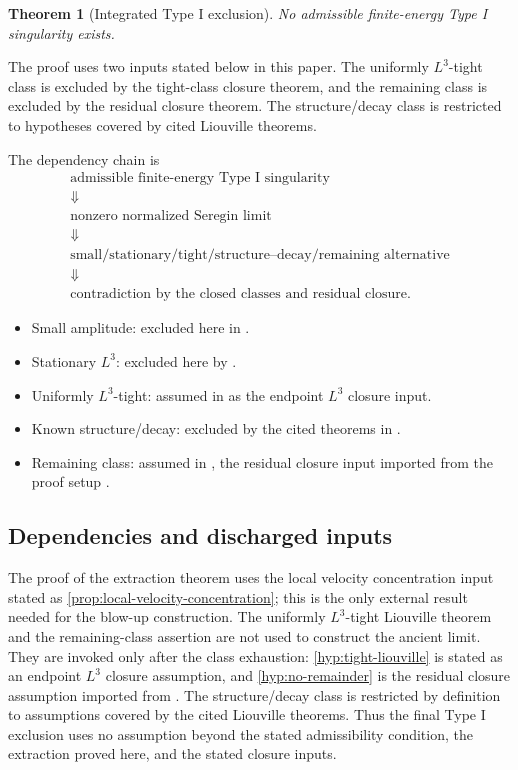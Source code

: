 \documentclass[11pt]{amsart}
\theoremstyle{plain}
\newtheorem{theorem}{Theorem}[section]
\theoremstyle{definition}
\theoremstyle{remark}
\numberwithin{equation}{section}
\begin{document}
\begin{theorem}[Integrated Type I exclusion]
\label{thm:remaining-criterion}
No admissible finite-energy Type I singularity exists.
\end{theorem}

The proof uses two inputs stated below in this paper.  The uniformly
\(L^3\)-tight class is excluded by the tight-class closure theorem, and the
remaining class is excluded by the residual closure theorem.  The
structure/decay class is restricted to hypotheses covered by cited Liouville
theorems.

The dependency chain is
\[
\begin{array}{c}
\text{admissible finite-energy Type I singularity}
\\
\Downarrow
\\
\text{nonzero normalized Seregin limit}
\\
\Downarrow
\\
\text{small/stationary/tight/structure--decay/remaining alternative}
\\
\Downarrow
\\
\text{contradiction by the closed classes and residual closure.}
\end{array}
\]

\begin{itemize}[leftmargin=*,itemsep=2pt]
\item Small amplitude: excluded here in .
\item Stationary \(L^3\): excluded here by \cite{NRS1996}.
\item Uniformly \(L^3\)-tight: assumed in  as the
endpoint \(L^3\) closure input.
\item Known structure/decay: excluded by the cited theorems in
.
\item Remaining class: assumed in , the residual
closure input imported from the proof setup \cite{ProofSetupTypeI}.
\end{itemize}

\subsection{Dependencies and discharged inputs}

The proof of the extraction theorem uses the local velocity concentration
input stated as \cref{prop:local-velocity-concentration}; this is the only
external result needed for the blow-up construction.  The uniformly
\(L^3\)-tight Liouville theorem and the remaining-class assertion are not used
to construct the ancient limit.  They are invoked only after the class
exhaustion: \cref{hyp:tight-liouville} is stated as an endpoint \(L^3\)
closure assumption, and \cref{hyp:no-remainder} is the residual closure
assumption imported from \cite{ProofSetupTypeI}.  The structure/decay
class is restricted by definition to assumptions covered by the cited
Liouville theorems.  Thus the final Type I exclusion uses no assumption beyond
the stated admissibility condition, the extraction proved here, and the
stated closure inputs.
\end{document}
